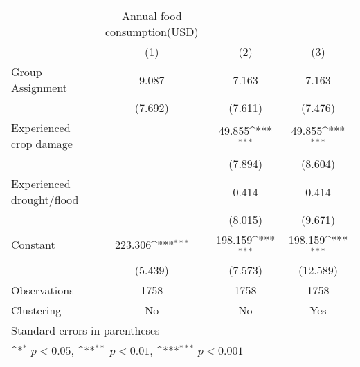 {
\def\sym#1{\ifmmode^{#1}\else\(^{#1}\)\fi}
\begin{tabular}{l*{3}{c}}
\hline\hline
                    &Annual food consumption(USD)                                     \\
                    &\multicolumn{1}{c}{(1)}         &\multicolumn{1}{c}{(2)}         &\multicolumn{1}{c}{(3)}         \\
\hline
Group Assignment    &       9.087         &       7.163         &       7.163         \\
                    &     (7.692)         &     (7.611)         &     (7.476)         \\
[1em]
Experienced crop damage&                     &      49.855\sym{***}&      49.855\sym{***}\\
                    &                     &     (7.894)         &     (8.604)         \\
[1em]
Experienced drought/flood&                     &       0.414         &       0.414         \\
                    &                     &     (8.015)         &     (9.671)         \\
[1em]
Constant            &     223.306\sym{***}&     198.159\sym{***}&     198.159\sym{***}\\
                    &     (5.439)         &     (7.573)         &    (12.589)         \\
\hline
Observations        &        1758         &        1758         &        1758         \\
Clustering          &          No         &          No         &         Yes         \\
\hline\hline
\multicolumn{4}{l}{\footnotesize Standard errors in parentheses}\\
\multicolumn{4}{l}{\footnotesize \sym{*} \(p<0.05\), \sym{**} \(p<0.01\), \sym{***} \(p<0.001\)}\\
\end{tabular}
}
